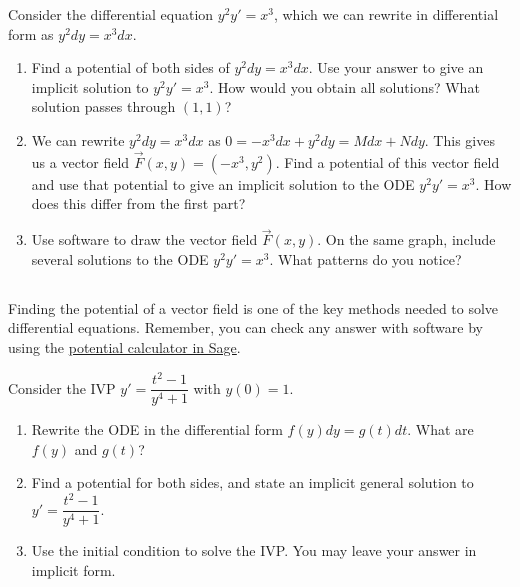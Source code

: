 \begin{problem}
 Consider the differential equation $y^2y'=x^3$, which we can rewrite in differential form as $y^2dy=x^3dx$.
\begin{enumerate}
 \item 
Find a potential of both sides of $y^2dy=x^3dx$.  Use your answer to give an implicit solution to $y^2y'=x^3$.  How would you obtain all solutions? What solution passes through $(1,1)$?
 \item 
We can rewrite $y^2dy=x^3dx$ as $0=-x^3dx+y^2dy = Mdx+Ndy$.  This gives us a vector field $\vec F(x,y)=(-x^3,y^2)$. Find a potential of this vector field and use that potential to give an implicit solution to the ODE $y^2y'=x^3$. How does this differ from the first part? 
 \item
{}%
Use software to draw the vector field $\vec F(x,y)$. On the same graph, include several solutions to the ODE $y^2y'=x^3$.  What patterns do you notice?
\end{enumerate}
\end{problem}


\subsection*{\ideaC}

Finding the potential of a vector field is one of the key methods needed to solve differential equations. Remember, you can check any answer with software by using the \href{\urlpotentialcalculator}{potential calculator in Sage}.

\begin{problem}
Consider the IVP $y'=\dfrac{t^2-1}{y^4+1}$ with $y(0)=1$.  
\begin{enumerate}
 \item {}%
Rewrite the ODE in the differential form $f(y)dy=g(t)dt$.  What are $f(y)$ and $g(t)$?
 \item Find a potential for both sides, and state an implicit general solution to $y'=\dfrac{t^2-1}{y^4+1}$.
 \item Use the initial condition to solve the IVP. You may leave your answer in implicit form.  
\end{enumerate}
\end{problem}

